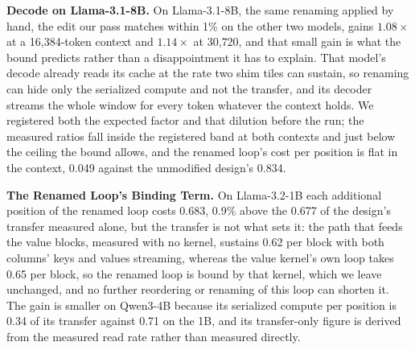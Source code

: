 \textbf{Decode on Llama-3.1-8B.}
On Llama-3.1-8B, the same renaming applied by hand, the edit our pass matches within 1\% on the other two models, gains $1.08\times$ at a 16{,}384-token context and $1.14\times$ at 30{,}720, and that small gain is what the bound predicts rather than a disappointment it has to explain.
That model's decode already reads its cache at the rate two shim tiles can sustain, so renaming can hide only the serialized compute and not the transfer, and its decoder streams the whole window for every token whatever the context holds.
We registered both the expected factor and that dilution before the run; the measured ratios fall inside the registered band at both contexts and just below the ceiling the bound allows, and the renamed loop's cost per position is flat in the context, 0.049\us{} against the unmodified design's 0.834.

\textbf{The Renamed Loop's Binding Term.}
On Llama-3.2-1B each additional position of the renamed loop costs 0.683\us{}, 0.9\% above the 0.677\us{} of the design's transfer measured alone, but the transfer is not what sets it: the path that feeds the value blocks, measured with no kernel, sustains 0.62\us{} per block with both columns' keys and values streaming, whereas the value kernel's own loop takes 0.65\us{} per block, so the renamed loop is bound by that kernel, which we leave unchanged, and no further reordering or renaming of this loop can shorten it.
The gain is smaller on Qwen3-4B because its serialized compute per position is 0.34 of its transfer against 0.71 on the 1B, and its transfer-only figure is derived from the measured read rate rather than measured directly.

